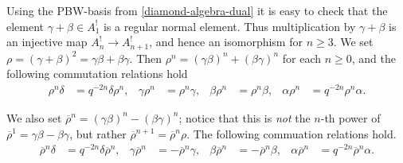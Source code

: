 \documentclass[11pt,fleqn]{article}
\renewcommand\to{\longrightarrow}
\newcommand\orho{\overline\rho}
\begin{document}
Using the PBW-basis from \ref{diamond-algebra-dual} it is easy to check that the element
$\gamma + \beta \in A^!_1$ is a regular normal element. Thus multiplication by $\gamma +
\beta$ is an injective map $A^!_n \to A^!_{n+1}$, and hence an isomorphism for 
$n \geq 3$. We set $\rho = (\gamma + \beta)^2 = \gamma\beta + \beta\gamma$. Then 
$\rho^n =
(\gamma\beta)^n + (\beta\gamma)^n$ for each $n \geq 0$, and the following commutation
relations hold
\begin{align*}
	\rho^n \delta&= q^{-2n} \delta\rho^n,
		& \gamma \rho^n &= \rho^n \gamma, 
		&\beta \rho^n &= \rho^n \beta,
		& \alpha \rho^n &= q^{-2n}\rho^n \alpha.
\end{align*}

We also set $\orho^n = (\gamma\beta)^n - (\beta\gamma)^n$; notice that this is \emph{not}
the $n$-th power of $\orho^1 = \gamma\beta-\beta\gamma$, but rather $\orho^{n+1} = 
\orho^n
\rho$. The following commuation relations hold.
\begin{align*}
	\orho^n \delta&= q^{-2n} \delta\orho^n,
		& \gamma \orho^n &= -\orho^n \gamma, 
		&\beta \orho^n &= -\orho^n \beta,
		& \alpha \orho^n &= q^{-2n}\orho^n \alpha.
\end{align*}
\end{document}
